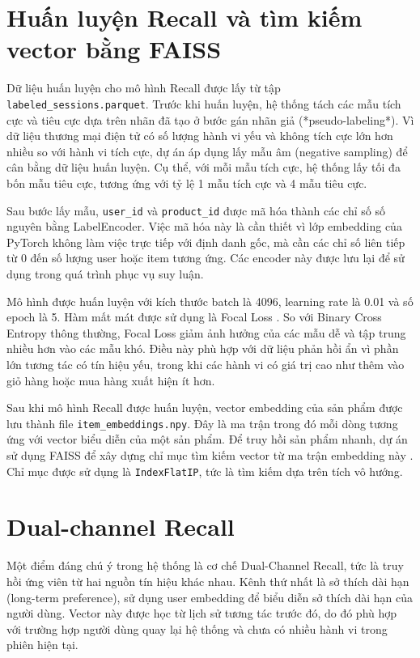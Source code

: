 \section{Huấn luyện Recall và tìm kiếm vector bằng FAISS}
Dữ liệu huấn luyện cho mô hình Recall được lấy từ tập \texttt{labeled\_sessions.parquet}. Trước khi huấn luyện, hệ thống tách các mẫu tích cực và tiêu cực dựa trên nhãn đã tạo ở bước gán nhãn giả (*pseudo-labeling*). Vì dữ liệu thương mại điện tử có số lượng hành vi yếu và không tích cực lớn hơn nhiều so với hành vi tích cực, dự án áp dụng lấy mẫu âm (negative sampling) để cân bằng dữ liệu huấn luyện. Cụ thể, với mỗi mẫu tích cực, hệ thống lấy tối đa bốn mẫu tiêu cực, tương ứng với tỷ lệ 1 mẫu tích cực và 4 mẫu tiêu cực.
\medskip

Sau bước lấy mẫu, \texttt{user\_id} và \texttt{product\_id} được mã hóa thành các chỉ số số nguyên bằng LabelEncoder. Việc mã hóa này là cần thiết vì lớp embedding của PyTorch không làm việc trực tiếp với định danh gốc, mà cần các chỉ số liên tiếp từ 0 đến số lượng user hoặc item tương ứng. Các encoder này được lưu lại để sử dụng trong quá trình phục vụ suy luận.
\medskip

Mô hình được huấn luyện với kích thước batch là 4096, learning rate là 0.01 và số epoch là 5. Hàm mất mát được sử dụng là Focal Loss \cite{lin2017focal}. So với Binary Cross Entropy thông thường, Focal Loss giảm ảnh hưởng của các mẫu dễ và tập trung nhiều hơn vào các mẫu khó. Điều này phù hợp với dữ liệu phản hồi ẩn vì phần lớn tương tác có tín hiệu yếu, trong khi các hành vi có giá trị cao như thêm vào giỏ hàng hoặc mua hàng xuất hiện ít hơn.
\medskip

Sau khi mô hình Recall được huấn luyện, vector embedding của sản phẩm được lưu thành file \texttt{item\_embeddings.npy}. Đây là ma trận trong đó mỗi dòng tương ứng với vector biểu diễn của một sản phẩm. Để truy hồi sản phẩm nhanh, dự án sử dụng FAISS để xây dựng chỉ mục tìm kiếm vector từ ma trận embedding này \cite{johnson2019billion}. Chỉ mục được sử dụng là \texttt{IndexFlatIP}, tức là tìm kiếm dựa trên tích vô hướng.

\section{Dual-channel Recall}
Một điểm đáng chú ý trong hệ thống là cơ chế Dual-Channel Recall, tức là truy hồi ứng viên từ hai nguồn tín hiệu khác nhau. Kênh thứ nhất là sở thích dài hạn (long-term preference), sử dụng user embedding để biểu diễn sở thích dài hạn của người dùng. Vector này được học từ lịch sử tương tác trước đó, do đó phù hợp với trường hợp người dùng quay lại hệ thống và chưa có nhiều hành vi trong phiên hiện tại.
\medskip

